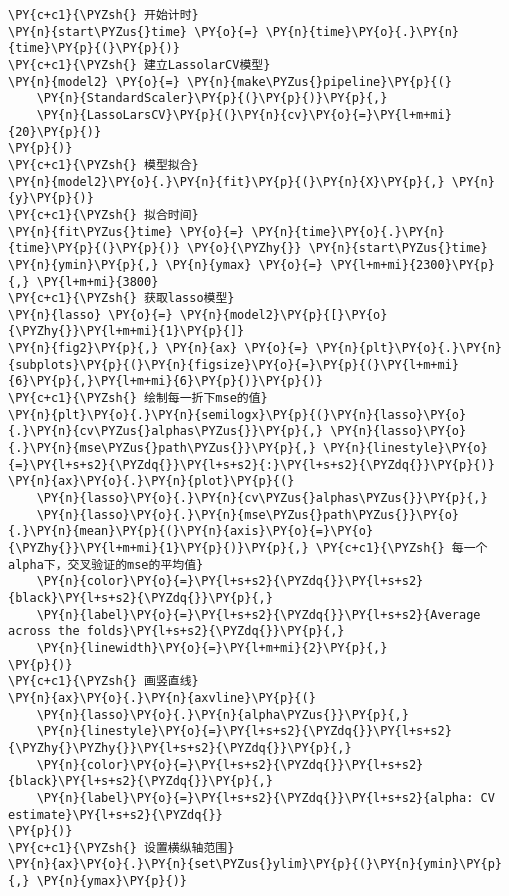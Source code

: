 \begin{Verbatim}[commandchars=\\\{\}]
\PY{c+c1}{\PYZsh{} 开始计时}
\PY{n}{start\PYZus{}time} \PY{o}{=} \PY{n}{time}\PY{o}{.}\PY{n}{time}\PY{p}{(}\PY{p}{)}
\PY{c+c1}{\PYZsh{} 建立LassolarCV模型}
\PY{n}{model2} \PY{o}{=} \PY{n}{make\PYZus{}pipeline}\PY{p}{(}
    \PY{n}{StandardScaler}\PY{p}{(}\PY{p}{)}\PY{p}{,} 
    \PY{n}{LassoLarsCV}\PY{p}{(}\PY{n}{cv}\PY{o}{=}\PY{l+m+mi}{20}\PY{p}{)}
\PY{p}{)}
\PY{c+c1}{\PYZsh{} 模型拟合}
\PY{n}{model2}\PY{o}{.}\PY{n}{fit}\PY{p}{(}\PY{n}{X}\PY{p}{,} \PY{n}{y}\PY{p}{)}
\PY{c+c1}{\PYZsh{} 拟合时间}
\PY{n}{fit\PYZus{}time} \PY{o}{=} \PY{n}{time}\PY{o}{.}\PY{n}{time}\PY{p}{(}\PY{p}{)} \PY{o}{\PYZhy{}} \PY{n}{start\PYZus{}time}
\PY{n}{ymin}\PY{p}{,} \PY{n}{ymax} \PY{o}{=} \PY{l+m+mi}{2300}\PY{p}{,} \PY{l+m+mi}{3800}
\PY{c+c1}{\PYZsh{} 获取lasso模型}
\PY{n}{lasso} \PY{o}{=} \PY{n}{model2}\PY{p}{[}\PY{o}{\PYZhy{}}\PY{l+m+mi}{1}\PY{p}{]}
\PY{n}{fig2}\PY{p}{,} \PY{n}{ax} \PY{o}{=} \PY{n}{plt}\PY{o}{.}\PY{n}{subplots}\PY{p}{(}\PY{n}{figsize}\PY{o}{=}\PY{p}{(}\PY{l+m+mi}{6}\PY{p}{,}\PY{l+m+mi}{6}\PY{p}{)}\PY{p}{)}
\PY{c+c1}{\PYZsh{} 绘制每一折下mse的值}
\PY{n}{plt}\PY{o}{.}\PY{n}{semilogx}\PY{p}{(}\PY{n}{lasso}\PY{o}{.}\PY{n}{cv\PYZus{}alphas\PYZus{}}\PY{p}{,} \PY{n}{lasso}\PY{o}{.}\PY{n}{mse\PYZus{}path\PYZus{}}\PY{p}{,} \PY{n}{linestyle}\PY{o}{=}\PY{l+s+s2}{\PYZdq{}}\PY{l+s+s2}{:}\PY{l+s+s2}{\PYZdq{}}\PY{p}{)}
\PY{n}{ax}\PY{o}{.}\PY{n}{plot}\PY{p}{(}
    \PY{n}{lasso}\PY{o}{.}\PY{n}{cv\PYZus{}alphas\PYZus{}}\PY{p}{,}
    \PY{n}{lasso}\PY{o}{.}\PY{n}{mse\PYZus{}path\PYZus{}}\PY{o}{.}\PY{n}{mean}\PY{p}{(}\PY{n}{axis}\PY{o}{=}\PY{o}{\PYZhy{}}\PY{l+m+mi}{1}\PY{p}{)}\PY{p}{,} \PY{c+c1}{\PYZsh{} 每一个alpha下，交叉验证的mse的平均值}
    \PY{n}{color}\PY{o}{=}\PY{l+s+s2}{\PYZdq{}}\PY{l+s+s2}{black}\PY{l+s+s2}{\PYZdq{}}\PY{p}{,}
    \PY{n}{label}\PY{o}{=}\PY{l+s+s2}{\PYZdq{}}\PY{l+s+s2}{Average across the folds}\PY{l+s+s2}{\PYZdq{}}\PY{p}{,}
    \PY{n}{linewidth}\PY{o}{=}\PY{l+m+mi}{2}\PY{p}{,}
\PY{p}{)}
\PY{c+c1}{\PYZsh{} 画竖直线}
\PY{n}{ax}\PY{o}{.}\PY{n}{axvline}\PY{p}{(}
    \PY{n}{lasso}\PY{o}{.}\PY{n}{alpha\PYZus{}}\PY{p}{,} 
    \PY{n}{linestyle}\PY{o}{=}\PY{l+s+s2}{\PYZdq{}}\PY{l+s+s2}{\PYZhy{}\PYZhy{}}\PY{l+s+s2}{\PYZdq{}}\PY{p}{,} 
    \PY{n}{color}\PY{o}{=}\PY{l+s+s2}{\PYZdq{}}\PY{l+s+s2}{black}\PY{l+s+s2}{\PYZdq{}}\PY{p}{,} 
    \PY{n}{label}\PY{o}{=}\PY{l+s+s2}{\PYZdq{}}\PY{l+s+s2}{alpha: CV estimate}\PY{l+s+s2}{\PYZdq{}}
\PY{p}{)}
\PY{c+c1}{\PYZsh{} 设置横纵轴范围}
\PY{n}{ax}\PY{o}{.}\PY{n}{set\PYZus{}ylim}\PY{p}{(}\PY{n}{ymin}\PY{p}{,} \PY{n}{ymax}\PY{p}{)}

\end{Verbatim}

